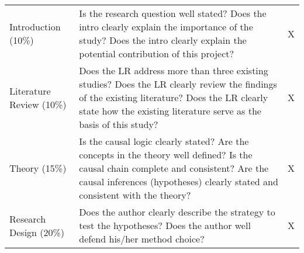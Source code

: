 \documentclass[11pt,]{article}
\theoremstyle{definition}
\theoremstyle{definition}
\theoremstyle{remark}
\begin{document}
\begin{longtable}[]{@{}lll@{}}
\begin{minipage}[t]{0.12\columnwidth}
Introduction (10\%)\strut
\end{minipage} & \begin{minipage}[t]{0.76\columnwidth}\raggedright\strut
Is the research question well stated? Does the intro clearly explain the
importance of the study? Does the intro clearly explain the potential
contribution of this project?\strut
\end{minipage} & \begin{minipage}[t]{0.03\columnwidth}\raggedright\strut
X\strut
\end{minipage}\tabularnewline
\begin{minipage}[t]{0.12\columnwidth}\raggedright\strut
Literature Review (10\%)\strut
\end{minipage} & \begin{minipage}[t]{0.76\columnwidth}\raggedright\strut
Does the LR address more than three existing studies? Does the LR
clearly review the findings of the existing literature? Does the LR
clearly state how the existing literature serve as the basis of this
study?\strut
\end{minipage} & \begin{minipage}[t]{0.03\columnwidth}\raggedright\strut
X\strut
\end{minipage}\tabularnewline
\begin{minipage}[t]{0.12\columnwidth}\raggedright\strut
Theory (15\%)\strut
\end{minipage} & \begin{minipage}[t]{0.76\columnwidth}\raggedright\strut
Is the causal logic clearly stated? Are the concepts in the theory well
defined? Is the causal chain complete and consistent? Are the causal
inferences (hypotheses) clearly stated and consistent with the
theory?\strut
\end{minipage} & \begin{minipage}[t]{0.03\columnwidth}\raggedright\strut
X\strut
\end{minipage}\tabularnewline
\begin{minipage}[t]{0.12\columnwidth}\raggedright\strut
Research Design (20\%)\strut
\end{minipage} & \begin{minipage}[t]{0.76\columnwidth}\raggedright\strut
Does the author clearly describe the strategy to test the hypotheses?
Does the author well defend his/her method choice?\strut
\end{minipage} & \begin{minipage}[t]{0.03\columnwidth}\raggedright\strut
X\strut

\end{minipage}
\end{longtable}
\end{document}
